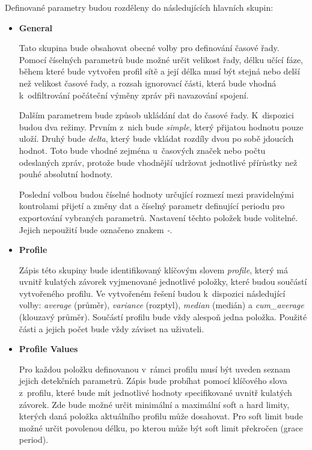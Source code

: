  
 Definované parametry budou rozděleny do následujících hlavních skupin:
 \begin{itemize}
  \item \textbf{General} 
  
  Tato skupina bude obsahovat obecné volby pro definování časové řady. Pomocí číselných parametrů 
  bude možné určit velikost řady, délku učící fáze, během které bude vytvořen profil sítě a její délka
  musí být stejná nebo delší než velikost časové řady, a rozsah ignorovací části, která bude vhodná
  k~odfiltrování počáteční výměny zpráv při navazování spojení. 
  
  Dalším parametrem bude způsob 
  ukládání dat do časové řady. K~dispozici budou dva režimy. Prvním z~nich bude \textit{simple},
  který přijatou
  hodnotu pouze uloží. Druhý bude \textit{delta}, který bude vkládat rozdíly dvou po
  sobě jdoucích hodnot. 
  Toto bude vhodné zejména u~časových značek nebo počtu odeslaných zpráv, protože bude vhodnější 
  udržovat jednotlivé přírůstky než pouhé absolutní hodnoty. 
  
  Poslední volbou budou číselné hodnoty určující rozmezí mezi pravidelnými kontrolami
  přijetí a změny dat a 
  číselný parametr definující periodu pro exportování vybraných parametrů. Nastavení těchto položek
  bude volitelné. Jejich nepoužití bude označeno znakem \textit{-}.
  
  \item \textbf{Profile}
  
  Zápis této skupiny bude identifikovaný klíčovým slovem \textit{profile}, který má uvnitř kulatých závorek 
  vyjmenované jednotlivé položky, které budou součástí vytvořeného profilu. Ve vytvořeném řešení 
  budou k~dispozici následující volby: \textit{average} (průměr), \textit{variance} (rozptyl), 
  \textit{median} (medián) a \textit{cum\_average} (klouzavý průměr). Součástí profilu bude vždy alespoň
  jedna položka. Použité části a jejich počet bude vždy záviset na uživateli.
  
  \item \textbf{Profile Values}
  
  Pro každou položku definovanou v~rámci profilu musí být uveden seznam jejich detekčních parametrů.
  Zápis bude probíhat pomocí klíčového slova z~profilu, které bude mít jednotlivé hodnoty 
  specifikované uvnitř kulatých závorek. Zde bude možné určit minimální a maximální soft a hard
  limity, kterých daná položka aktuálního profilu může dosahovat. Pro soft limit bude možné 
  určit povolenou délku, po kterou může být soft limit překročen (grace period). 
  

\end{itemize}
